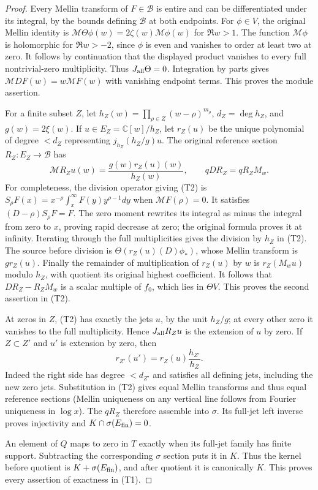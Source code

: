 \documentclass[11pt]{article}
\newcommand{\C}{\mathbb C}\newcommand{\R}{\mathbb R}
\newcommand{\B}{\mathscr B}\newcommand{\M}{\mathcal M}
\begin{document}
\begin{proof}
Every Mellin transform of $F\in\B$ is entire and can be differentiated
under its integral, by the bounds defining $\B$ at both endpoints.
For $\phi\in V$, the original Mellin identity is
$\M\Theta\phi(w)=2\zeta(w)\M\phi(w)$ for $\Re w>1$.
The function $\M\phi$ is holomorphic for $\Re w>-2$, since $\phi$
is even and vanishes to order at least two at zero. It follows by
continuation that the displayed product vanishes to every full
nontrivial-zero multiplicity. Thus $J_{\rm all}\Theta=0$.
Integration by parts gives $\M DF(w)=w\M F(w)$ with vanishing endpoint
terms. This proves the module assertion.

For a finite subset $Z$, let
$h_Z(w)=\prod_{\rho\in Z}(w-\rho)^{m_\rho}$, $d_Z=\deg h_Z$, and
$g(w)=2\xi(w)$. If $u\in E_Z=\C[w]/h_Z$, let $r_Z(u)$ be the
unique polynomial of degree $<d_Z$ representing $j_{h_Z}(h_Z/g)u$.
The original reference section $R_Z:E_Z\to\B$ has
\[
 \M R_Zu(w)=\frac{g(w)r_Z(u)(w)}{h_Z(w)},\qquad
 qDR_Z=qR_ZM_w.\tag{T2}
\]
For completeness, the division operator giving (T2) is
$S_\rho F(x)=x^{-\rho}\int_x^\infty F(y)y^{\rho-1}dy$ when
$\M F(\rho)=0$. It satisfies $(D-\rho)S_\rho F=F$.
The zero moment rewrites its integral as minus the integral from zero
to $x$, proving rapid decrease at zero; the original formula proves it
at infinity. Iterating through the full multiplicities gives the
division by $h_Z$ in (T2). The source before division is
$\Theta(r_Z(u)(D)\phi_*)$, whose Mellin transform is $g r_Z(u)$.
Finally the remainder of multiplication of $r_Z(u)$ by $w$ is
$r_Z(M_wu)$ modulo $h_Z$, with quotient its original highest coefficient.
It follows that $DR_Z-R_ZM_w$ is a scalar multiple of $f_0$,
which lies in $\Theta V$. This proves the second assertion in (T2).

At zeros in $Z$, (T2) has exactly the jets $u$, by the unit $h_Z/g$;
at every other zero it vanishes to the full multiplicity. Hence
$J_{\rm all}R_Zu$ is the extension of $u$ by zero.
If $Z\subset Z'$ and $u'$ is extension by zero, then
\[
 r_{Z'}(u')=r_Z(u)\frac{h_{Z'}}{h_Z}.
\]
Indeed the right side has degree $<d_{Z'}$ and satisfies all defining
jets, including the new zero jets. Substitution in (T2) gives equal
Mellin transforms and thus equal reference sections (Mellin uniqueness
on any vertical line follows from Fourier uniqueness in $\log x$).
The $qR_Z$ therefore assemble into $\sigma$. Its full-jet left inverse
proves injectivity and $K\cap\sigma(E_{\rm fin})=0$.

An element of $Q$ maps to zero in $T$ exactly when its full-jet family
has finite support. Subtracting the corresponding $\sigma$ section
puts it in $K$. Thus the kernel before quotient is
$K+\sigma(E_{\rm fin})$, and after quotient it is canonically $K$.
This proves every assertion of exactness in (T1).


\end{proof}
\end{document}
